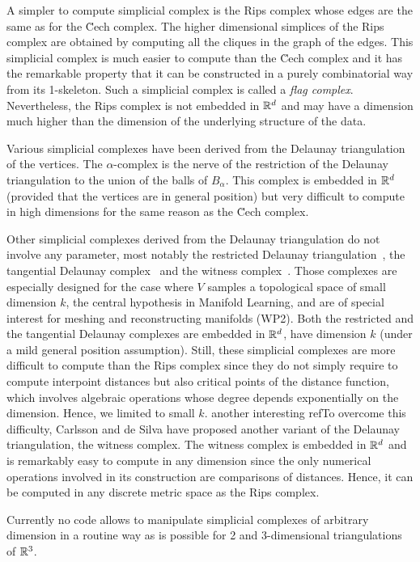 A simpler to compute simplicial complex is the Rips complex whose edges are the same as for the \u{C}ech complex. The higher dimensional simplices of the Rips complex are obtained by computing all the cliques in the graph of the edges. This simplicial complex is much easier to compute than the \u{C}ech complex and it has the remarkable property that it can be constructed in a purely combinatorial way from its 1-skeleton.  Such a simplicial complex is called a {\em flag
  complex}. Nevertheless, the Rips complex is not embedded in $\mathbb R ^d$
and may have a dimension much higher than the dimension of the underlying structure
of the data.


Various simplicial complexes have been derived from the Delaunay
triangulation of the vertices. The $\alpha$-complex is the nerve of
the restriction of the Delaunay triangulation to the union of the
balls of $B_{\alpha}$. This complex is embedded in $\mathbb R^d$ (provided
that the vertices are in general position) but very difficult to
compute in high dimensions for the same reason as the \u{C}ech complex.

Other simplicial complexes derived from the Delaunay triangulation do not involve any parameter, most notably the restricted Delaunay triangulation~\cite{he-gtmg-2001}, the tangential Delaunay complex~\cite{geometrica-7142i} and the witness complex~\cite{cds-tewc-2004}. Those complexes are especially designed for the case where $V$ samples a topological space of small dimension $k$, the central hypothesis in Manifold Learning, and are of special interest for meshing and reconstructing manifolds (WP2). Both the restricted and the tangential Delaunay complexes are embedded in $\mathbb R^d$, have dimension $k$ (under a mild general position assumption). Still, these simplicial complexes are more difficult to compute 
than the Rips complex since they do not simply require to compute interpoint distances but also  critical points of the distance function, which involves algebraic operations whose degree depends exponentially on the dimension. Hence, we limited to small $k$.
another interesting refTo overcome this difficulty, Carlsson and de Silva have proposed another variant of the Delaunay triangulation,  the witness complex. The witness complex is embedded in $\mathbb R ^d$ and is remarkably easy to compute in any dimension since the only numerical operations involved in its construction are comparisons of distances. Hence, it can be computed in any discrete metric space as the Rips complex.

 Currently no code allows to manipulate simplicial complexes of arbitrary dimension in a routine way as is possible for 2 and 3-dimensional triangulations of $\mathbb R ^3$.

